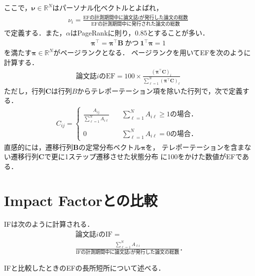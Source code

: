ここで，$\bm{\nu} \in \mathbb{R}^N$はパーソナル化ベクトルとよばれ，
\begin{align}
    \nu_i = 
    \frac{\text{EFの計測期間中に論文誌$i$が発行した論文の総数}}{\text{EFの計測期間中に発行された論文の総数}}
\end{align}
で定義する．また，$\alpha$はPageRankに則り，$0.85$とすることが多い．
\begin{align}
    \bm{\pi}^{\top} = \bm{\pi}^{\top}\bm{B}~\text{かつ}~ \bm{1}^{\top}\bm{\pi}=1
\end{align}
を満たす$\bm{\pi} \in \mathbb{R}^N$がページランクとなる．
ページランクを用いてEFを次のように計算する．
\begin{align}
    \text{論文誌$i$のEF} = 100 \times \frac{( \bm{\pi}^{\top} \bm{C} )_i}{\sum_{\ell=1}^N ( \bm{\pi}^{\top} \bm{C} )_{\ell}}
\end{align}
ただし，行列$\bm{C}$は行列$B$からテレポーテーション項を除いた行列で，次で定義する\cite{Masuda2013}．
\begin{align}
    C_{ij} =
    \begin{cases}
        \frac{A_{ij}}{\sum_{\ell=1}^N A_{i\ell}}
        &\quad \sum_{\ell=1}^N A_{i\ell} \geq 1\text{の場合．} \\
        \\
        0
        &\quad \sum_{\ell=1}^N A_{i\ell} =0\text{の場合．} 
    \end{cases}
\end{align}
直感的には，遷移行列$\bm{B}$の定常分布ベクトル$\bm{\pi}$を，
テレポーテーションを含まない遷移行列$\bm{C}$で更に1ステップ遷移させた状態分布
に100をかけた数値がEFである．


\section{Impact Factorとの比較}
IFは次のように計算される．
\begin{align}
    & \text{論文誌$i$のIF} = \\
    & \frac{\sum_{\ell=1}^N A_{\ell i}}{\text{IFの計測期間中に論文誌$i$が発行した論文の総数}}．
\end{align}

IFと比較したときのEFの長所短所について述べる．
